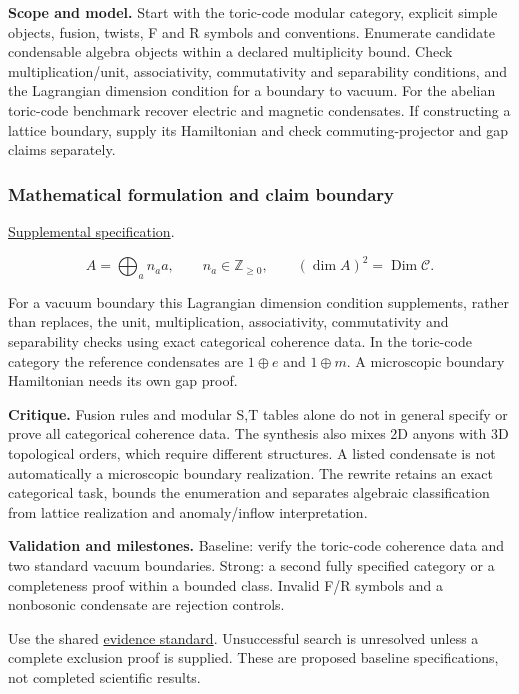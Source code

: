 \documentclass[
  11pt,
]{article}
\begin{document}
\textbf{Scope and model.} Start with the toric-code modular category,
explicit simple objects, fusion, twists, F and R symbols and
conventions. Enumerate candidate condensable algebra objects within a
declared multiplicity bound. Check multiplication/unit, associativity,
commutativity and separability conditions, and the Lagrangian dimension
condition for a boundary to vacuum. For the abelian toric-code benchmark
recover electric and magnetic condensates. If constructing a lattice
boundary, supply its Hamiltonian and check commuting-projector and gap
claims separately.

\subsubsection{Mathematical formulation and claim boundary}

\href{https://github.com/rick-stevens-ai/Pure-Thought/blob/main/supplemental/S08.md}{Supplemental
specification}.

\[A=\bigoplus_a n_a a,\qquad n_a\in\mathbb Z_{\ge0},\qquad
(\dim A)^2=\operatorname{Dim}\mathcal C.\]

For a vacuum boundary this Lagrangian dimension condition supplements,
rather than replaces, the unit, multiplication, associativity,
commutativity and separability checks using exact categorical coherence
data. In the toric-code category the reference condensates are
\(1\oplus e\) and \(1\oplus m\). A microscopic boundary Hamiltonian
needs its own gap proof.

\textbf{Critique.} Fusion rules and modular S,T tables alone do not in
general specify or prove all categorical coherence data. The synthesis
also mixes 2D anyons with 3D topological orders, which require different
structures. A listed condensate is not automatically a microscopic
boundary realization. The rewrite retains an exact categorical task,
bounds the enumeration and separates algebraic classification from
lattice realization and anomaly/inflow interpretation.

\textbf{Validation and milestones.} Baseline: verify the toric-code
coherence data and two standard vacuum boundaries. Strong: a second
fully specified category or a completeness proof within a bounded class.
Invalid F/R symbols and a nonbosonic condensate are rejection controls.

Use the shared
\href{https://github.com/rick-stevens-ai/Pure-Thought/blob/main/reviews/EVIDENCE-STANDARD.md}{evidence
standard}. Unsuccessful search is unresolved unless a complete exclusion
proof is supplied. These are proposed baseline specifications, not
completed scientific results.
\end{document}
